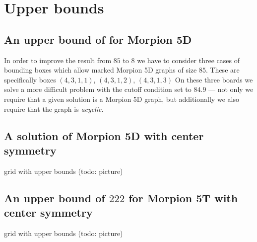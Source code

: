 \section{Upper bounds}
\label{sec:upper}

  
\subsection{An upper bound of \therecord for Morpion 5D}

In order to improve the result from $85$ to $8$ we have to consider three cases of bounding boxes which allow marked Morpion 5D graphs of size $85$. These
are specifically boxes $(4,3,1,1)$, $(4,3,1,2)$, $(4,3,1,3)$  
On these three boards we solve a more difficult problem with the cutoff condition set to $84.9$ --- not only we require that a given solution is a 
Morpion 5D graph, but additionally we also require that the graph is {\em acyclic}. 

\subsection{A solution of Morpion 5D with center symmetry}

  grid with upper bounds (todo: picture)
  
\subsection{An upper bound of $222$ for Morpion 5T with center symmetry}

  grid with upper bounds (todo: picture)

